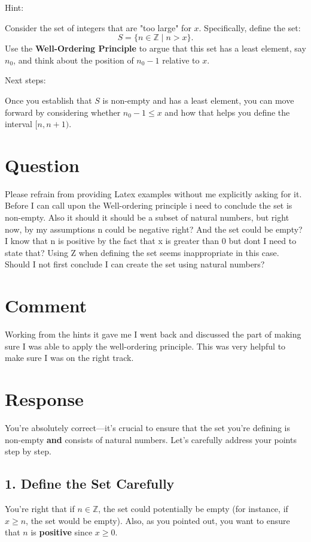 \documentclass{article}
\begin{document}
Hint:

Consider the set of integers that are "too large" for \( x \). Specifically, define the set:
\[
S = \{ n \in \mathbb{Z} \mid n > x \}.
\]
Use the \textbf{Well-Ordering Principle} to argue that this set has a least element, say \( n_0 \), and think about the position of \( n_0 - 1 \) relative to \( x \).

Next steps:

Once you establish that \( S \) is non-empty and has a least element, you can move forward by considering whether \( n_0 - 1 \leq x \) and how that helps you define the interval \( [n, n+1) \).

\section*{Question}
Please refrain from providing Latex examples without me explicitly asking for it. Before I can call upon the Well-ordering principle i need to conclude the set is non-empty. Also it should it should be a subset of natural numbers, but right now, by my assumptions n could be negative right? And the set could be empty? I know that n is positive by the fact that x is greater than 0 but dont I need to state that? Using Z when defining the set seems inappropriate in this case. Should I not first conclude I can create the set using natural numbers?

\section*{Comment}
Working from the hints it gave me I went back and discussed the part of making sure I was able to apply the well-ordering principle. This was very helpful to make sure I was on the right track.

\section*{Response}

You're absolutely correct—it's crucial to ensure that the set you're defining is non-empty \textbf{and} consists of natural numbers. Let’s carefully address your points step by step.

\subsection*{1. Define the Set Carefully}

You're right that if \( n \in \mathbb{Z} \), the set could potentially be empty (for instance, if \( x \geq n \), the set would be empty). Also, as you pointed out, you want to ensure that \( n \) is \textbf{positive} since \( x \geq 0 \).
\end{document}
